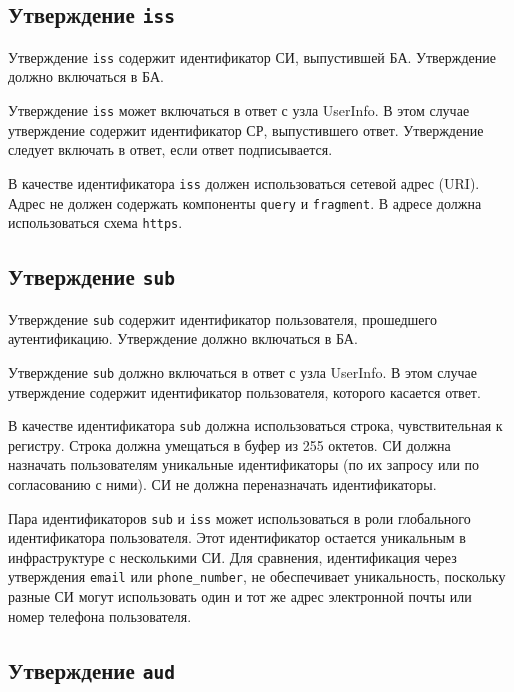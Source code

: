 \label{CLAIMS.Auth}

\subsection{Утверждение \lstinline{iss}}\label{CLAIMS.Iss}

Утверждение \lstinline{iss} содержит идентификатор СИ, выпустившей БА.
%
Утверждение должно включаться в БА.

Утверждение \lstinline{iss} может включаться в ответ с узла UserInfo.
В этом случае утверждение содержит идентификатор СР, выпустившего ответ.
%
Утверждение следует включать в ответ, если ответ подписывается.

В качестве идентификатора \lstinline{iss} должен использоваться сетевой адрес 
(URI). 
%
Адрес не должен содержать компоненты \lstinline{query} и \lstinline{fragment}.
%
В адресе должна использоваться схема \lstinline{https}.

\subsection{Утверждение \lstinline{sub}}\label{CLAIMS.Sub}

Утверждение \lstinline{sub} содержит идентификатор пользователя, 
прошедшего аутентификацию.
%
Утверждение должно включаться в БА.

Утверждение \lstinline{sub} должно включаться в ответ с узла UserInfo.
%
В этом случае утверждение содержит идентификатор пользователя, которого 
касается ответ.

В качестве идентификатора \lstinline{sub} должна использоваться строка,
чувствительная к регистру. Строка должна умещаться в буфер из 255 октетов.
%
СИ должна назначать пользователям уникальные идентификаторы (по их запросу или 
по согласованию с ними). СИ не должна переназначать идентификаторы.

\begin{note*}
Пара идентификаторов \lstinline{sub} и \lstinline{iss} может использоваться
в роли глобального идентификатора пользователя. Этот идентификатор 
остается уникальным в инфраструктуре с несколькими СИ.
%
Для сравнения, идентификация через утверждения \lstinline{email} или 
\lstinline{phone_number}, не обеспечивает уникальность, 
поскольку разные СИ могут использовать один и тот же адрес 
электронной почты или номер телефона пользователя.
\end{note*}

\subsection{Утверждение \lstinline{aud}}\label{CLAIMS.Aud}

